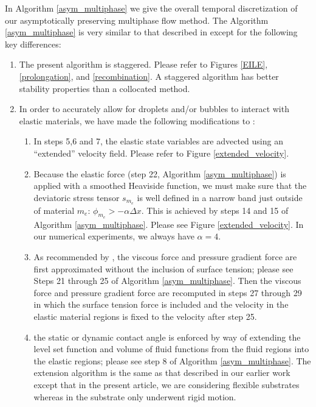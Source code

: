 \documentclass[]{article}
\begin{document}
In Algorithm \ref{asym_multiphase} we give the overall temporal discretization
of our asymptotically preserving multiphase flow method.  The Algorithm
\ref{asym_multiphase} is very similar to that described in
\cite{jemison2014compressible} except for the following key differences:
\par\noindent
\begin{enumerate}
\item The present algorithm is staggered.  Please refer to Figures
  \ref{EILE},
  \ref{prolongation},
  and \ref{recombination}.  
 A staggered algorithm has better stability
 properties than a collocated method\cite{LECHENADEC2013185,
  sugiyama2011full,shin2020interaction,GUITTET2015215}.
\item In order to accurately allow for droplets and/or bubbles to interact
  with elastic materials, we have made the following modifications to
  \cite{jemison2014compressible}:
  \begin{enumerate}
  \item In steps 5,6 and 7, the elastic state variables are advected using 
    an ``extended'' velocity field.  Please refer to Figure
    \ref{extended_velocity}. 
  \item Because the elastic force (step 22, Algorithm \ref{asym_multiphase})
    is applied with a smoothed Heaviside function, we must make
    sure that the deviatoric stress tensor $s_{m_{e}}$ 
    is well defined in a narrow band just outside of material 
    $m_{e}$: $\phi_{m_{e}}>-\alpha\Delta x$.
    This is achieved by steps 14 and 15 of Algorithm
    \ref{asym_multiphase}.  Please see Figure \ref{extended_velocity}.
    In our numerical experiments, we always
    have $\alpha=4$.
  \item As recommended by \cite{shin2020interaction}, the viscous force
    and pressure gradient force are first approximated without the
    inclusion of surface tension; please see Steps 21 through 25
    of Algorithm \ref{asym_multiphase}.
    Then the viscous force and pressure gradient force are recomputed
    in steps 27 through 29 in which the surface tension force is
    included and the velocity in the elastic material regions is fixed
    to the velocity after step 25.
  \item the static or dynamic contact angle is enforced by way of 
    extending the level set function and volume of fluid functions
    from the fluid regions into the elastic regions; please see
    step 8 of Algorithm \ref{asym_multiphase}.  The extension algorithm
    is the same as that described in our earlier 
    work\cite{arienti2014embedded} except that in the present article,
    we are considering flexible substrates whereas in 
    \cite{arienti2014embedded} the substrate only underwent rigid 
    motion.  
  \end{enumerate}
\end{enumerate}
\end{document}
